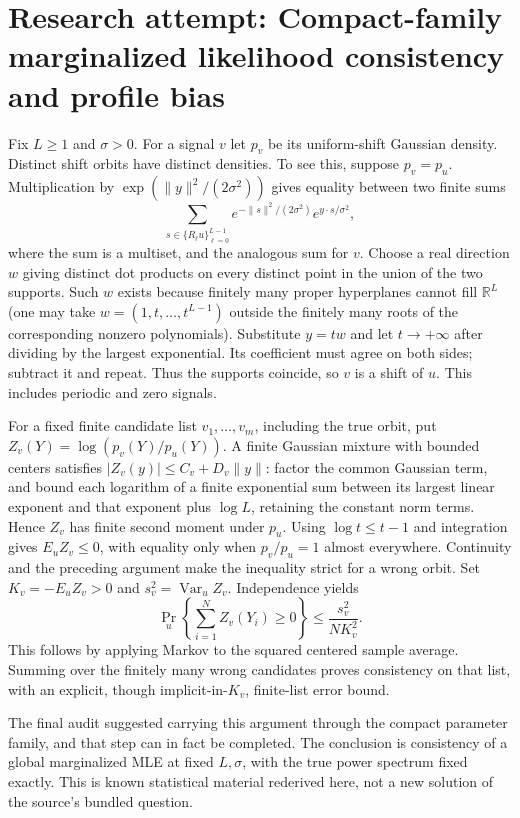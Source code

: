 \documentclass[11pt]{article}
\begin{document}
\section{Research attempt: Compact-family marginalized likelihood consistency and profile bias}
Fix $L\ge1$ and $\sigma>0$. For a signal $v$ let $p_v$ be its uniform-shift
Gaussian density. Distinct shift orbits have distinct densities. To see this,
suppose $p_v=p_u$. Multiplication by $\exp(\|y\|^2/(2\sigma^2))$ gives equality
between two finite sums
\[
 \sum_{s\in\{R_\ell u\}_{\ell=0}^{L-1}}
 e^{-\|s\|^2/(2\sigma^2)}e^{y\cdot s/\sigma^2},
\]
where the sum is a multiset, and the analogous sum for $v$. Choose a real
direction $w$ giving distinct dot products on every distinct point in the union
of the two supports. Such $w$ exists because finitely many proper hyperplanes
cannot fill $\mathbb R^L$ (one may take $w=(1,t,\ldots,t^{L-1})$ outside the
finitely many roots of the corresponding nonzero polynomials). Substitute
$y=tw$ and let $t\to+\infty$ after dividing by the largest exponential. Its
coefficient must agree on both sides; subtract it and repeat. Thus the supports
coincide, so $v$ is a shift of $u$. This includes periodic and zero signals.

For a fixed finite candidate list $v_1,\ldots,v_m$, including the true orbit,
put $Z_v(Y)=\log(p_v(Y)/p_u(Y))$. A finite Gaussian mixture with bounded centers
satisfies
$|Z_v(y)|\le C_v+D_v\|y\|$: factor the common Gaussian term, and bound each
logarithm of a finite exponential sum between its largest linear exponent and
that exponent plus $\log L$, retaining the constant norm terms. Hence $Z_v$
has finite second moment under $p_u$.
Using $\log t\le t-1$ and integration gives
$E_u Z_v\le0$, with equality only when $p_v/p_u=1$ almost everywhere.
Continuity and the preceding argument make the inequality strict for a wrong orbit.
Set $K_v=-E_u Z_v>0$ and $s_v^2=\operatorname{Var}_u Z_v$. Independence yields
\[
 \Pr_u\!\left\{\sum_{i=1}^N Z_v(Y_i)\ge0\right\}
 \le\frac{s_v^2}{NK_v^2}.
\]
This follows by applying Markov to the squared centered sample average.
Summing over the finitely many wrong candidates proves consistency on that list,
with an explicit, though implicit-in-$K_v$, finite-list error bound.

The final audit suggested carrying this argument through the compact
parameter family, and that step can in fact be completed. The conclusion is
consistency of a global marginalized MLE at fixed $L,\sigma$, with the true
power spectrum fixed exactly. This is known statistical material rederived here,
not a new solution of the source's bundled question.
\end{document}

